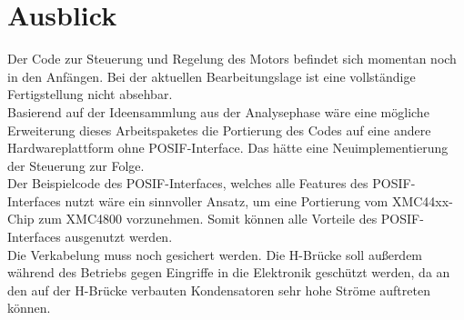 \section{Ausblick}
Der Code zur Steuerung und Regelung des Motors befindet sich momentan noch in den Anfängen. Bei der aktuellen Bearbeitungslage ist eine vollständige Fertigstellung nicht absehbar. \\
Basierend auf der Ideensammlung aus der Analysephase wäre eine mögliche Erweiterung dieses Arbeitspaketes die Portierung des Codes auf eine andere Hardwareplattform ohne POSIF-Interface. Das hätte eine Neuimplementierung der Steuerung zur Folge. \\
Der Beispielcode des POSIF-Interfaces, welches alle Features des POSIF-Interfaces nutzt wäre ein sinnvoller Ansatz, um eine Portierung vom XMC44xx-Chip zum XMC4800 vorzunehmen. Somit können alle Vorteile des POSIF-Interfaces ausgenutzt werden. \\
Die Verkabelung muss noch gesichert werden. Die H-Brücke soll außerdem während des Betriebs gegen Eingriffe in die Elektronik geschützt werden, da an den auf der H-Brücke verbauten Kondensatoren sehr hohe Ströme auftreten können.

